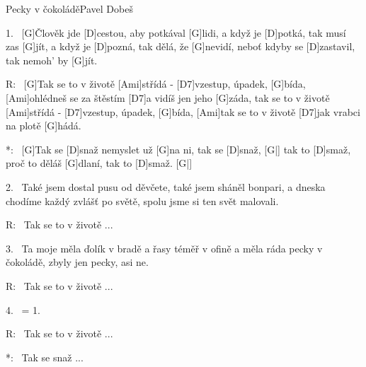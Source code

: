 \begin{song}{Pecky v čokoládě}{Pavel Dobeš}

\begin{xverse}{1.~}
[G]{Čl}ověk jde [D]cestou, aby potkával [G]lidi,
a když je [D]potká, tak musí zas [G]jít,
a když je [D]pozná, tak dělá, že [G]nevidí,
neboť kdyby se [D]zastavil, tak nemoh' by [G]jít.
\end{xverse}

\begin{xverse}{R:~}
[G]Tak se to v životě [Ami]střídá - [D7]vzestup, úpadek, [G]bída,
[Ami]ohlédneš se za štěstím [D7]a vidíš jen jeho [G]záda,
tak se to v životě [Ami]střídá - [D7]vzestup, úpadek, [G]bída,
[Ami]tak se to v životě [D7]jak vrabci na plotě [G]hádá.
\end{xverse}

\begin{xverse}{*:~}
[G]Tak se [D]snaž nemyslet už [G]na ni, tak se [D]snaž, [G|]{}
tak to [D]smaž, proč to děláš [G]dlaní, tak to [D]smaž. [G|]{}
\end{xverse}

\begin{xverse}{2.~}
Také jsem dostal pusu od děvčete,
také jsem sháněl bonpari,
a dneska chodíme každý zvlášť po světě,
spolu jsme si ten svět malovali.
\end{xverse}

\begin{xverse}{R:~}
Tak se to v životě ...
\end{xverse}

\begin{xverse}{3.~}
Ta moje měla ďolík v bradě
a řasy téměř v ofině
a měla ráda pecky v čokoládě,
zbyly jen pecky, asi ne.
\end{xverse}

\begin{xverse}{R:~}
Tak se to v životě ...
\end{xverse}

\begin{xverse}{4.~}
= 1.
\end{xverse}

\begin{xverse}{R:~}
Tak se to v životě ...
\end{xverse}

\begin{xverse}{*:~}
Tak se snaž ...
\end{xverse}

\end{song}





